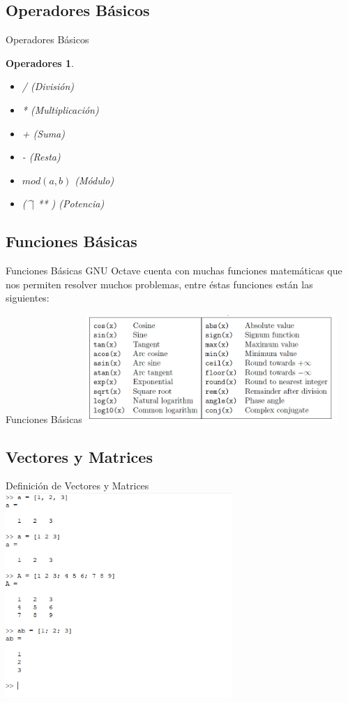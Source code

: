 \documentclass[12pt]{beamer}
\newtheorem{oper}{Operadores}
\begin{document}
\subsection{Operadores Básicos}
\begin{frame}{Operadores Básicos}
\begin{oper}
	\begin{itemize}
		\item / (División)
		\item * (Multiplicación)
		\item + (Suma)
		\item - (Resta)
		\item $mod(a, b)$ (Módulo)
		\item (\^\space\space $\mid$ ** ) (Potencia) 
	\end{itemize}
\end{oper}
\end{frame}

\subsection{Funciones Básicas}
\begin{frame}{Funciones Básicas}
GNU Octave cuenta con muchas funciones matemáticas que nos permiten resolver muchos problemas, entre éstas funciones están las siguientes:
\end{frame}
\begin{frame}{Funciones Básicas}
\includegraphics[width=270pt]{images/functions.jpg}
\end{frame}
\subsection{Vectores y Matrices}
\begin{frame}{Definición de Vectores y Matrices}
\includegraphics[height=220pt]{images/vectmat.png}
\end{frame}
\end{document}
